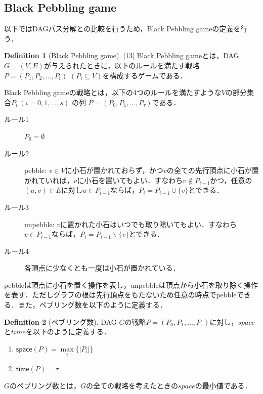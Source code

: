 \documentclass[master]{kuisthesis}		%
\theoremstyle{plain}
\theoremstyle{definition}
\newtheorem{definition*}{Definition}
\begin{document}
\subsection{Black Pebbling game} %
以下ではDAGパス分解との比較を行うため，Black Pebbling gameの定義を行う．

\begin{definition*}[Black Pebbling game][13]
    Black Pebbling gameとは，DAG $G = (V, E)$が与えられたときに，以下のルールを満たす戦略$P=(P_1, P_2, \dots, P_t)$ $(P_i \subseteq V)$を構成するゲームである．


    Black Pebbling gameの戦略とは，以下の4つのルールを満たすような$V$の部分集合$ P_i\ (i = 0, 1,   \dots, s)$ の列 $P = (P_0, P_1,   \dots, P_{\tau})$である．

    \begin{description}
        \item[ルール1] $P_0 = \emptyset$
        \item[ルール2] pebble: $v \in V$に小石が置かれておらず，かつ$v$の全ての先行頂点に小石が置かれていれば，$v$に小石を置いてもよい．すなわち$v \notin P_{i-1}$かつ，任意の$(u, v) \in E$に対し$u \in P_{i-1}$ならば，$P_i = P_{i-1} \cup \{v\}$とできる．
        \item[ルール3] unpebble: $v$に置かれた小石はいつでも取り除いてもよい．すなわち$v \in P_{i-1}$ならば，$P_i = P_{i-1} \backslash \{v\}$とできる．
        \item[ルール4] 各頂点に少なくとも一度は小石が置かれている．
    \end{description}
\end{definition*}

pebbleは頂点に小石を置く操作を表し，unpebbleは頂点から小石を取り除く操作を表す．ただしグラフの根は先行頂点をもたないため任意の時点でpebbleできる．また，ペブリング数を以下のように定義する．

\begin{definition*}[ペブリング数]
    DAG $G$の戦略$P = (P_0, P_1,   \dots, P_{\tau})$に対し，$space$と$time$を以下のように定義する．

    \begin{enumerate}
        \item $\mathsf{space}(P) =  \underset{i}{\max} \{ |P_i| \}$
        \item $\mathsf{time}(P) = \tau$
    \end{enumerate}

    $G$のペブリング数とは，$G$の全ての戦略を考えたときの$space$の最小値である．

\end{definition*}
\end{document}
